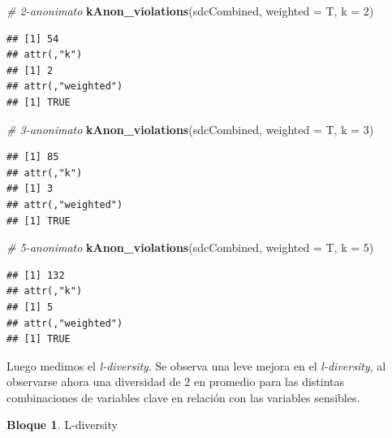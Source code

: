 \documentclass[]{book}
\newenvironment{Shaded}{\begin{snugshade}}{\end{snugshade}}
\newcommand{\CommentTok}[1]{\textcolor[rgb]{0.56,0.35,0.01}{\textit{#1}}}
\newcommand{\DataTypeTok}[1]{\textcolor[rgb]{0.13,0.29,0.53}{#1}}
\newcommand{\DecValTok}[1]{\textcolor[rgb]{0.00,0.00,0.81}{#1}}
\newcommand{\KeywordTok}[1]{\textcolor[rgb]{0.13,0.29,0.53}{\textbf{#1}}}
\newcommand{\NormalTok}[1]{#1}
\newcommand{\OperatorTok}[1]{\textcolor[rgb]{0.81,0.36,0.00}{\textbf{#1}}}
\newcommand{\OtherTok}[1]{\textcolor[rgb]{0.56,0.35,0.01}{#1}}
\newcommand{\StringTok}[1]{\textcolor[rgb]{0.31,0.60,0.02}{#1}}
\theoremstyle{definition}
\theoremstyle{definition}
\newtheorem{example}{Bloque}[chapter]
\theoremstyle{definition}
\theoremstyle{definition}
\theoremstyle{remark}
\begin{document}
\begin{Shaded}
\begin{Highlighting}[]
\CommentTok{# 2-anonimato}
\KeywordTok{kAnon_violations}\NormalTok{(sdcCombined, }\DataTypeTok{weighted =}\NormalTok{ T, }\DataTypeTok{k =} \DecValTok{2}\NormalTok{) }
\end{Highlighting}
\end{Shaded}

\begin{verbatim}
## [1] 54
## attr(,"k")
## [1] 2
## attr(,"weighted")
## [1] TRUE
\end{verbatim}

\begin{Shaded}
\begin{Highlighting}[]
\CommentTok{# 3-anonimato}
\KeywordTok{kAnon_violations}\NormalTok{(sdcCombined, }\DataTypeTok{weighted =}\NormalTok{ T, }\DataTypeTok{k =} \DecValTok{3}\NormalTok{) }
\end{Highlighting}
\end{Shaded}

\begin{verbatim}
## [1] 85
## attr(,"k")
## [1] 3
## attr(,"weighted")
## [1] TRUE
\end{verbatim}

\begin{Shaded}
\begin{Highlighting}[]
\CommentTok{# 5-anonimato}
\KeywordTok{kAnon_violations}\NormalTok{(sdcCombined, }\DataTypeTok{weighted =}\NormalTok{ T, }\DataTypeTok{k =} \DecValTok{5}\NormalTok{) }
\end{Highlighting}
\end{Shaded}

\begin{verbatim}
## [1] 132
## attr(,"k")
## [1] 5
## attr(,"weighted")
## [1] TRUE
\end{verbatim}

Luego medimos el \emph{l-diversity}. Se observa una leve mejora en el \emph{l-diversity}, al observarse ahora una diversidad de 2 en promedio para las distintas combinaciones de variables clave en relación con las variables sensibles.

\begin{example}
\protect\hypertarget{exm:bloque63nbm}{}{\label{exm:bloque63nbm} }L-diversity
\end{example}

\begin{Shaded}
\end{Shaded}
\end{document}
